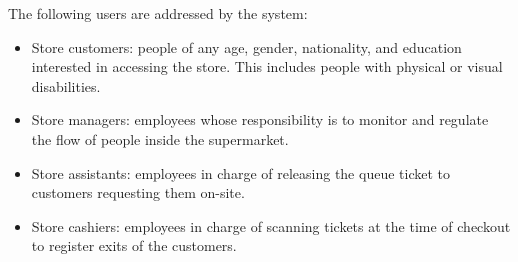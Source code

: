 \documentclass[../../main.tex]{subfiles}
\begin{document}
	The following users are addressed by the system:
	\begin{itemize}
		\item Store customers: people of any age, gender, nationality, and education interested in accessing the store. This includes people with physical or visual disabilities.
		\item Store managers: employees whose responsibility is to monitor and regulate the flow of people inside the supermarket.
		\item Store assistants: employees in charge of releasing the queue ticket to customers requesting them on-site.
		\item Store cashiers: employees in charge of scanning tickets at the time of checkout to register exits of the customers.
	\end{itemize}
\end{document}
